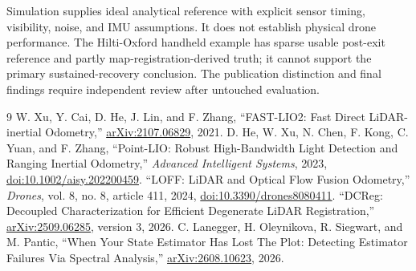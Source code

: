 \documentclass[11pt,a4paper]{article}
\begin{document}
Simulation supplies ideal analytical reference with explicit sensor timing,
visibility, noise, and IMU assumptions. It does not establish physical drone
performance. The Hilti-Oxford handheld example has sparse usable post-exit
reference and partly map-registration-derived truth; it cannot support the
primary sustained-recovery conclusion. The publication distinction and final
findings require independent review after untouched evaluation.

\begin{thebibliography}{9}
 W. Xu, Y. Cai, D. He, J. Lin, and F. Zhang,
``FAST-LIO2: Fast Direct LiDAR-inertial Odometry,''
\href{https://arxiv.org/abs/2107.06829}{arXiv:2107.06829}, 2021.
 D. He, W. Xu, N. Chen, F. Kong, C. Yuan, and F. Zhang,
``Point-LIO: Robust High-Bandwidth Light Detection and Ranging Inertial
Odometry,'' \emph{Advanced Intelligent Systems}, 2023,
\href{https://doi.org/10.1002/aisy.202200459}{doi:10.1002/aisy.202200459}.
 ``LOFF: LiDAR and Optical Flow Fusion Odometry,''
\emph{Drones}, vol. 8, no. 8, article 411, 2024,
\href{https://doi.org/10.3390/drones8080411}{doi:10.3390/drones8080411}.
 ``DCReg: Decoupled Characterization for Efficient Degenerate
LiDAR Registration,'' \href{https://arxiv.org/abs/2509.06285}{arXiv:2509.06285},
version 3, 2026.
 C. Lanegger, H. Oleynikova, R. Siegwart, and M. Pantic,
``When Your State Estimator Has Lost The Plot: Detecting Estimator Failures
Via Spectral Analysis,'' \href{https://arxiv.org/abs/2608.10623}{arXiv:2608.10623}, 2026.
\end{thebibliography}
\end{document}
